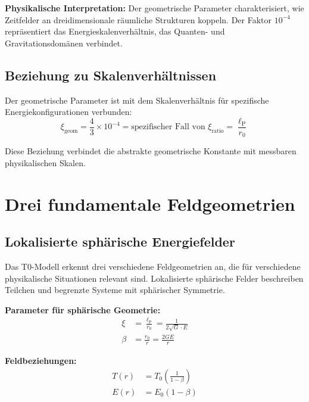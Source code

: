 \documentclass[12pt,a4paper]{report}
\newcommand{\lP}{\ell_{\text{P}}}         %
\newcommand{\rzero}{r_0}                  %
\newcommand{\xigeom}{\xi_{\text{geom}}}   %
\newcommand{\xirat}{\xi_{\text{ratio}}}   %
\begin{document}
	\textbf{Physikalische Interpretation:} Der geometrische Parameter charakterisiert, wie Zeitfelder an dreidimensionale räumliche Strukturen koppeln. Der Faktor $10^{-4}$ repräsentiert das Energieskalenverhältnis, das Quanten- und Gravitationsdomänen verbindet.
	
	\subsection{Beziehung zu Skalenverhältnissen}\label{subsec:geometric_scale_relationship}
	
	Der geometrische Parameter ist mit dem Skalenverhältnis für spezifische Energiekonfigurationen verbunden:
	\begin{equation}
		\xigeom = \frac{4}{3} \times 10^{-4} = \text{spezifischer Fall von } \xirat = \frac{\lP}{\rzero}
	\end{equation}
	
	Diese Beziehung verbindet die abstrakte geometrische Konstante mit messbaren physikalischen Skalen.
	
	\section{Drei fundamentale Feldgeometrien}\label{sec:field_geometries}
	
	\subsection{Lokalisierte sphärische Energiefelder}\label{subsec:localized_spherical}
	
	Das T0-Modell erkennt drei verschiedene Feldgeometrien an, die für verschiedene physikalische Situationen relevant sind. Lokalisierte sphärische Felder beschreiben Teilchen und begrenzte Systeme mit sphärischer Symmetrie.
	
	\textbf{Parameter für sphärische Geometrie:}
	\begin{align}
		\xi &= \frac{\lP}{\rzero} = \frac{1}{2\sqrt{G} \cdot E} \label{eq:xi_localized}\\
		\beta &= \frac{\rzero}{r} = \frac{2GE}{r} \label{eq:beta_localized}
	\end{align}
	
	\textbf{Feldbeziehungen:}
	\begin{align}
		T(r) &= T_0\left(\frac{1}{1 - \beta}\right) \\
		E(r) &= E_0(1 - \beta)
	\end{align}
	
\end{document}
